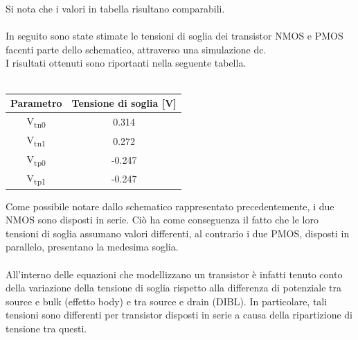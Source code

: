 \documentclass[11pt,  english, makeidx, a4paper, titlepage, oneside]{book}
\begin{document}
\vspace{0.3cm}
Si nota che i valori in tabella risultano comparabili.
\\\\
In seguito sono state stimate le tensioni di soglia dei transistor NMOS e PMOS facenti parte dello schematico, attraverso una simulazione dc.
\\
I risultati ottenuti sono riportanti nella seguente tabella.
\\\\
\begin{center}
	\begin{tabular}{|c|c|}
	\hline
	Parametro & Tensione di soglia [V] \\
	\hline
	 V\textsubscript{tn0} & 0.314\\
	\hline
	 V\textsubscript{tn1} & 0.272 \\
	\hline
	V\textsubscript{tp0} & -0.247 \\
	\hline
	V\textsubscript{tp1} & -0.247 \\
	\hline
	\end{tabular}	
\end{center}
\vspace{0.3cm}
Come possibile notare dallo schematico rappresentato precedentemente, i due NMOS sono disposti in serie. Ciò ha come conseguenza il fatto che le loro tensioni di soglia assumano valori differenti, al contrario i due PMOS, disposti in parallelo, presentano la medesima soglia.
\\\\
All'interno delle equazioni che modellizzano un transistor è infatti tenuto conto della variazione della tensione di soglia rispetto alla differenza di potenziale tra source e bulk (effetto body) e tra source e drain (DIBL). In particolare, tali tensioni sono differenti per transistor disposti in serie a causa della ripartizione di tensione tra questi.
\\\\
\end{document}
